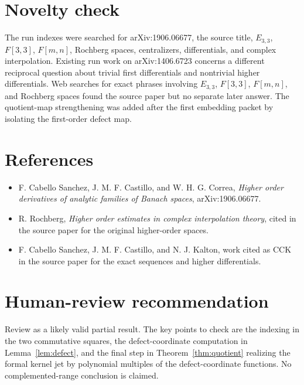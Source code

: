 \documentclass[11pt]{article}
\begin{document}
\section*{Novelty check}

The run indexes were searched for arXiv:1906.06677, the source title, \(E_{3,3}\), \(F[3,3]\), \(F[m,n]\), Rochberg spaces, centralizers, differentials, and complex interpolation.  Existing run work on arXiv:1406.6723 concerns a different reciprocal question about trivial first differentials and nontrivial higher differentials.  Web searches for exact phrases involving \(E_{3,3}\), \(F[3,3]\), \(F[m,n]\), and Rochberg spaces found the source paper but no separate later answer.  The quotient-map strengthening was added after the first embedding packet by isolating the first-order defect map.

\section*{References}

\begin{itemize}[leftmargin=2em]
\item F. Cabello Sanchez, J. M. F. Castillo, and W. H. G. Correa, \emph{Higher order derivatives of analytic families of Banach spaces}, arXiv:1906.06677.
\item R. Rochberg, \emph{Higher order estimates in complex interpolation theory}, cited in the source paper for the original higher-order spaces.
\item F. Cabello Sanchez, J. M. F. Castillo, and N. J. Kalton, work cited as CCK in the source paper for the exact sequences and higher differentials.
\end{itemize}

\section*{Human-review recommendation}

Review as a likely valid partial result.  The key points to check are the indexing in the two commutative squares, the defect-coordinate computation in Lemma~\ref{lem:defect}, and the final step in Theorem~\ref{thm:quotient} realizing the formal kernel jet by polynomial multiples of the defect-coordinate functions.  No complemented-range conclusion is claimed.
\end{document}
